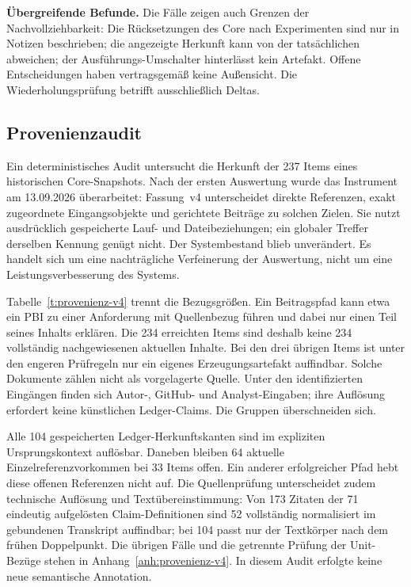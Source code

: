 \textbf{Übergreifende Befunde.} Die Fälle zeigen auch Grenzen der
Nachvollziehbarkeit: Die Rücksetzungen des Core nach Experimenten
sind nur in Notizen beschrieben; die angezeigte Herkunft kann von
der tatsächlichen abweichen; der Ausführungs-Umschalter hinterlässt
kein Artefakt. Offene Entscheidungen haben vertragsgemäß keine
Außensicht. Die Wiederholungsprüfung betrifft ausschließlich Deltas.

\subsection{Provenienzaudit}
\label{sec:eval-provenienz}

Ein deterministisches Audit untersucht die Herkunft der 237 Items
eines historischen Core-Snapshots. Nach der ersten Auswertung wurde
das Instrument am 13.09.2026 überarbeitet: Fassung~v4 unterscheidet
direkte Referenzen, exakt zugeordnete Eingangsobjekte und gerichtete
Beiträge zu solchen Zielen. Sie nutzt ausdrücklich gespeicherte
Lauf- und Dateibeziehungen; ein globaler Treffer derselben Kennung
genügt nicht. Der Systembestand blieb unverändert. Es handelt sich
um eine nachträgliche Verfeinerung der Auswertung, nicht um eine
Leistungsverbesserung des Systems.



Tabelle~\ref{t:provenienz-v4} trennt die Bezugsgrößen. Ein
Beitragspfad kann etwa ein PBI zu einer Anforderung mit Quellenbezug
führen und dabei nur einen Teil seines Inhalts erklären.
Die 234 erreichten Items sind deshalb keine 234 vollständig
nachgewiesenen aktuellen Inhalte. Bei den drei übrigen Items ist
unter den engeren Prüfregeln nur ein eigenes Erzeugungsartefakt
auffindbar. Solche Dokumente zählen nicht als vorgelagerte Quelle.
Unter den identifizierten Eingängen finden sich Autor-, GitHub-
und Analyst-Eingaben; ihre Auflösung erfordert keine künstlichen
Ledger-Claims. Die Gruppen überschneiden sich.

\begin{samepage}
Alle 104 gespeicherten Ledger-Herkunftskanten sind im expliziten
Ursprungskontext auflösbar. Daneben bleiben 64 aktuelle
Einzelreferenzvorkommen bei 33 Items offen. Ein anderer erfolgreicher
Pfad hebt diese offenen Referenzen nicht auf. Die Quellenprüfung
unterscheidet zudem technische Auflösung und Textübereinstimmung:
Von 173 Zitaten der 71 eindeutig aufgelösten Claim-Definitionen sind
52 vollständig normalisiert im gebundenen Transkript auffindbar;
bei 104 passt nur der Textkörper nach dem frühen Doppelpunkt.
Die übrigen Fälle und die getrennte Prüfung der Unit-Bezüge stehen
in Anhang~\ref{anh:provenienz-v4}. In diesem Audit erfolgte keine neue semantische
Annotation.
\par
\end{samepage}

